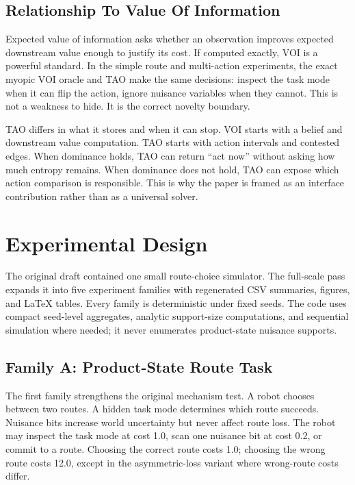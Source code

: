\documentclass{article}
\begin{document}
\subsection{Relationship To Value Of Information}

Expected value of information asks whether an observation improves expected downstream value enough to justify its cost. If computed exactly, VOI is a powerful standard. In the simple route and multi-action experiments, the exact myopic VOI oracle and TAO make the same decisions: inspect the task mode when it can flip the action, ignore nuisance variables when they cannot. This is not a weakness to hide. It is the correct novelty boundary.

TAO differs in what it stores and when it can stop. VOI starts with a belief and downstream value computation. TAO starts with action intervals and contested edges. When dominance holds, TAO can return ``act now'' without asking how much entropy remains. When dominance does not hold, TAO can expose which action comparison is responsible. This is why the paper is framed as an interface contribution rather than as a universal solver.

\section{Experimental Design}

The original draft contained one small route-choice simulator. The full-scale pass expands it into five experiment families with regenerated CSV summaries, figures, and LaTeX tables. Every family is deterministic under fixed seeds. The code uses compact seed-level aggregates, analytic support-size computations, and sequential simulation where needed; it never enumerates product-state nuisance supports.

\subsection{Family A: Product-State Route Task}

The first family strengthens the original mechanism test. A robot chooses between two routes. A hidden task mode determines which route succeeds. Nuisance bits increase world uncertainty but never affect route loss. The robot may inspect the task mode at cost 1.0, scan one nuisance bit at cost 0.2, or commit to a route. Choosing the correct route costs 1.0; choosing the wrong route costs 12.0, except in the asymmetric-loss variant where wrong-route costs differ.
\end{document}
